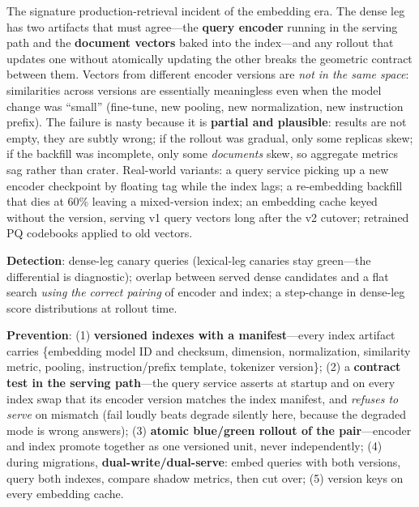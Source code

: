 \begin{warningbox}[title={\small Warning: The Embedding-Version-Skew Incident}]
The signature production-retrieval incident of the embedding era. The dense leg has two artifacts that must agree---the \textbf{query encoder} running in the serving path and the \textbf{document vectors} baked into the index---and any rollout that updates one without atomically updating the other breaks the geometric contract between them. Vectors from different encoder versions are \textit{not in the same space}: similarities across versions are essentially meaningless even when the model change was ``small'' (fine-tune, new pooling, new normalization, new instruction prefix). The failure is nasty because it is \textbf{partial and plausible}: results are not empty, they are subtly wrong; if the rollout was gradual, only some replicas skew; if the backfill was incomplete, only some \textit{documents} skew, so aggregate metrics sag rather than crater. Real-world variants: a query service picking up a new encoder checkpoint by floating tag while the index lags; a re-embedding backfill that dies at 60\% leaving a mixed-version index; an embedding cache keyed without the version, serving v1 query vectors long after the v2 cutover; retrained PQ codebooks applied to old vectors.

\textbf{Detection}: dense-leg canary queries (lexical-leg canaries stay green---the differential is diagnostic); overlap between served dense candidates and a flat search \textit{using the correct pairing} of encoder and index; a step-change in dense-leg score distributions at rollout time.

\textbf{Prevention}: (1) \textbf{versioned indexes with a manifest}---every index artifact carries \{embedding model ID and checksum, dimension, normalization, similarity metric, pooling, instruction/prefix template, tokenizer version\}; (2) a \textbf{contract test in the serving path}---the query service asserts at startup and on every index swap that its encoder version matches the index manifest, and \textit{refuses to serve} on mismatch (fail loudly beats degrade silently here, because the degraded mode is wrong answers); (3) \textbf{atomic blue/green rollout of the pair}---encoder and index promote together as one versioned unit, never independently; (4) during migrations, \textbf{dual-write/dual-serve}: embed queries with both versions, query both indexes, compare shadow metrics, then cut over; (5) version keys on every embedding cache.
\end{warningbox}

